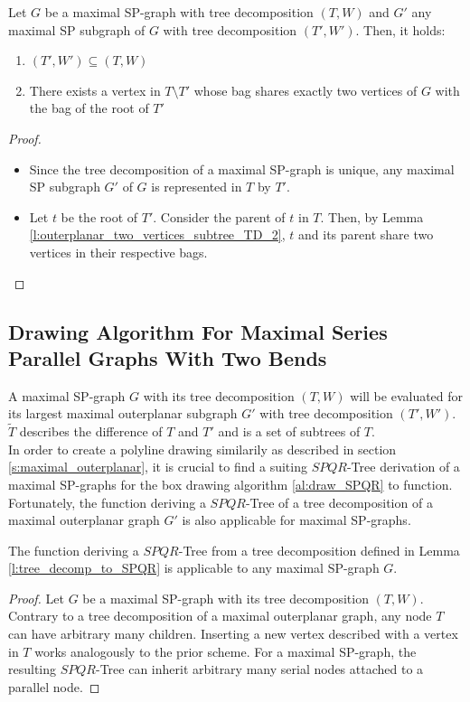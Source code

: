 \begin{lemma}
	Let $G$ be a maximal SP-graph with tree decomposition $(T,W)$ and $G'$ any maximal SP subgraph of $G$ with tree decomposition $(T',W')$. Then, it holds:
	\begin{enumerate}
		\item $(T',W') \subseteq (T,W)$
		\item There exists a vertex in $T\setminus T'$ whose bag shares exactly two vertices of $G$ with the bag of the root of $T'$
	\end{enumerate}
\end{lemma}	
\begin{proof}
	\begin{itemize}
		\item Since the tree decomposition of a maximal SP-graph is unique, any maximal SP subgraph $G'$ of $G$ is represented in $T$ by $T'$.
		\item Let $t$ be the root of $T'$. Consider the parent of $t$ in $T$. Then, by Lemma \ref{l:outerplanar_two_vertices_subtree_TD_2}, $t$ and its parent share two vertices in their respective bags.
	\end{itemize}
\end{proof}


\subsection{Drawing Algorithm For Maximal Series Parallel Graphs With Two Bends}

A maximal SP-graph $G$ with its tree decomposition $(T,W)$ will be evaluated for its largest maximal outerplanar subgraph $G'$ with tree decomposition $(T',W')$. $\tilde{T}$ describes the difference of $T$ and $T'$ and is a set of subtrees of $T$.\\
In order to create a polyline drawing similarily as described in section \ref{s:maximal_outerplanar}, it is crucial to find a suiting $SPQR$-Tree derivation of a maximal SP-graphs for the box drawing algorithm \ref{al:draw_SPQR} to function. Fortunately, the function deriving a $SPQR$-Tree of a tree decomposition of a maximal outerplanar graph $G'$ is also applicable for maximal SP-graphs.
\begin{lemma}
	The function deriving a $SPQR$-Tree from a tree decomposition defined in Lemma \ref{l:tree_decomp_to_SPQR} is applicable to any maximal SP-graph $G$.
\end{lemma}
\begin{proof}
	Let $G$ be a maximal SP-graph with its tree decomposition $(T,W)$. Contrary to a tree decomposition of a maximal outerplanar graph, any node $T$ can have arbitrary many children. Inserting a new vertex described with a vertex in $T$ works analogously to the prior scheme. For a maximal SP-graph, the resulting $SPQR$-Tree can inherit arbitrary many serial nodes attached to a parallel node.
\end{proof}

